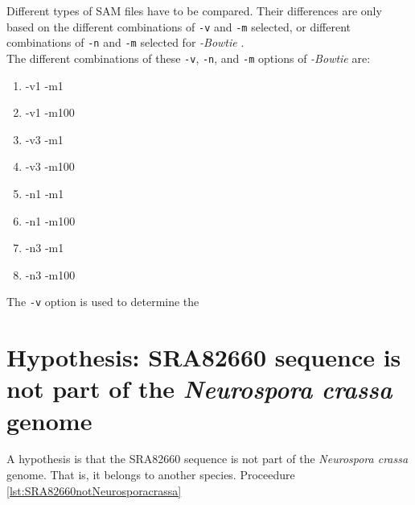 \documentclass[letter,12pt]{article}
\begin{document}
Different types of SAM files have to be compared. Their differences are only based on the different combinations of {\tt -v} and {\tt -m} selected, or different combinations of {\tt -n} and {\tt -m} selected for {\it -Bowtie} \cite{Langmead2014}. \\

The different combinations of these {\tt -v}, {\tt -n}, and {\tt -m} options of {\it -Bowtie} are: \vspace{-0.3cm}
\begin{enumerate} \itemsep -4pt
\item -v1 -m1
\item -v1 -m100
\item -v3 -m1
\item -v3 -m100
\item -n1 -m1
\item -n1 -m100
\item -n3 -m1
\item -n3 -m100
\end{enumerate}

The {\tt -v} option is used to determine the 
\cite{Aramayo2014}





\section{Hypothesis: SRA82660 sequence is not part of the {\it Neurospora crassa} genome}
\label{sec:Hypothesis}


A hypothesis is that the SRA82660 sequence is not part of the {\it Neurospora crassa} genome. That is, it belongs to another species. Proceedure \ref{lst:SRA82660notNeurosporacrassa}
\end{document}
